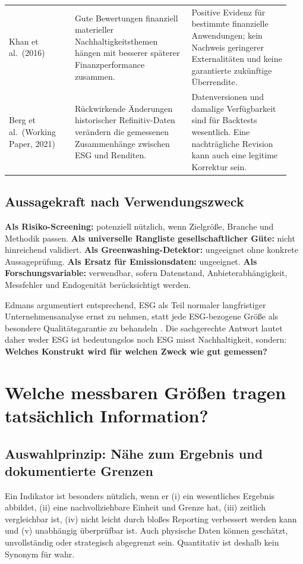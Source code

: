 \documentclass[11pt,a4paper]{article}
\begin{document}
\begin{longtable}{@{}P{0.22\linewidth}P{0.39\linewidth}P{0.33\linewidth}@{}}
Khan et al.\ (2016) \cite{khan2016} & Gute Bewertungen finanziell materieller Nachhaltigkeitsthemen hängen mit besserer späterer Finanzperformance zusammen. & Positive Evidenz für bestimmte finanzielle Anwendungen; kein Nachweis geringerer Externalitäten und keine garantierte zukünftige Überrendite. \\
Berg et al.\ (Working Paper, 2021) \cite{berg2021} & Rückwirkende Änderungen historischer Refinitiv-Daten verändern die gemessenen Zusammenhänge zwischen ESG und Renditen. & Datenversionen und damalige Verfügbarkeit sind für Backtests wesentlich. Eine nachträgliche Revision kann auch eine legitime Korrektur sein. \\
\bottomrule
\end{longtable}
\normalsize

\subsection{Aussagekraft nach Verwendungszweck}
\textbf{Als Risiko-Screening:} potenziell nützlich, wenn Zielgröße, Branche und Methodik passen. \textbf{Als universelle Rangliste gesellschaftlicher Güte:} nicht hinreichend validiert. \textbf{Als Greenwashing-Detektor:} ungeeignet ohne konkrete Aussageprüfung. \textbf{Als Ersatz für Emissionsdaten:} ungeeignet. \textbf{Als Forschungsvariable:} verwendbar, sofern Datenstand, Anbieterabhängigkeit, Messfehler und Endogenität berücksichtigt werden.

Edmans argumentiert entsprechend, ESG als Teil normaler langfristiger Unternehmensanalyse ernst zu nehmen, statt jede ESG-bezogene Größe als besondere Qualitätsgarantie zu behandeln \cite{edmans2023}. Die sachgerechte Antwort lautet daher weder \glqq ESG ist bedeutungslos\grqq{} noch \glqq ESG misst Nachhaltigkeit\grqq, sondern: \textbf{Welches Konstrukt wird für welchen Zweck wie gut gemessen?}

\section{Welche messbaren Größen tragen tatsächlich Information?}
\label{sec:metrics}
\subsection{Auswahlprinzip: Nähe zum Ergebnis und dokumentierte Grenzen}
Ein Indikator ist besonders nützlich, wenn er (i) ein wesentliches Ergebnis abbildet, (ii) eine nachvollziehbare Einheit und Grenze hat, (iii) zeitlich vergleichbar ist, (iv) nicht leicht durch bloßes Reporting verbessert werden kann und (v) unabhängig überprüfbar ist. Auch physische Daten können geschätzt, unvollständig oder strategisch abgegrenzt sein. \glqq Quantitativ\grqq{} ist deshalb kein Synonym für \glqq wahr\grqq.
\end{document}
